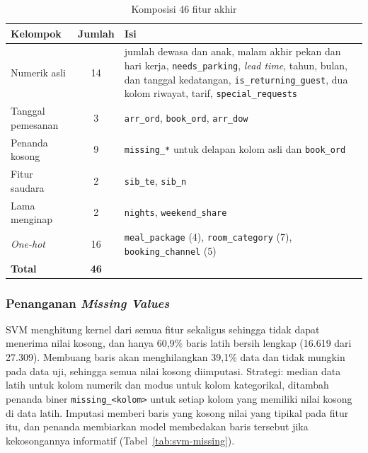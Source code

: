 \begin{table}[H]
	\centering
	\caption{Komposisi 46 fitur akhir}
	\label{tab:svm-komposisi}
	\small
	\begin{tabularx}{\textwidth}{l c Y}
		\toprule
		\textbf{Kelompok} & \textbf{Jumlah} & \textbf{Isi} \\
		\midrule
		Numerik asli & 14 & jumlah dewasa dan anak, malam akhir pekan dan hari kerja, \texttt{needs\_parking}, \textit{lead time}, tahun, bulan, dan tanggal kedatangan, \texttt{is\_returning\_guest}, dua kolom riwayat, tarif, \texttt{special\_requests} \\
		Tanggal pemesanan & 3 & \texttt{arr\_ord}, \texttt{book\_ord}, \texttt{arr\_dow} \\
		Penanda kosong & 9 & \texttt{missing\_*} untuk delapan kolom asli dan \texttt{book\_ord} \\
		Fitur saudara & 2 & \texttt{sib\_te}, \texttt{sib\_n} \\
		Lama menginap & 2 & \texttt{nights}, \texttt{weekend\_share} \\
		\textit{One-hot} & 16 & \texttt{meal\_package} (4), \texttt{room\_category} (7), \texttt{booking\_channel} (5) \\
		\midrule
		\textbf{Total} & \textbf{46} & \\
		\bottomrule
	\end{tabularx}
\end{table}

\subsubsection{Penanganan \textit{Missing Values}}
SVM menghitung kernel dari semua fitur sekaligus sehingga tidak dapat menerima nilai kosong, dan hanya 60,9\% baris latih bersih lengkap (16.619 dari 27.309). Membuang baris akan menghilangkan 39,1\% data dan tidak mungkin pada data uji, sehingga semua nilai kosong diimputasi. Strategi: median data latih untuk kolom numerik dan modus untuk kolom kategorikal, ditambah penanda biner \texttt{missing\_<kolom>} untuk setiap kolom yang memiliki nilai kosong di data latih. Imputasi memberi baris yang kosong nilai yang tipikal pada fitur itu, dan penanda membiarkan model membedakan baris tersebut jika kekosongannya informatif (Tabel~\ref{tab:svm-missing}).

